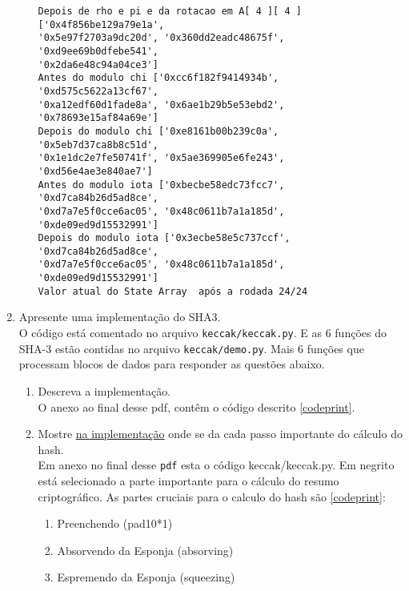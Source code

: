 \documentclass[12pt, a4paper]{article}
\begin{document}
\begin{enumerate}
\begin{enumerate}
\begin{verbatim}
Depois de rho e pi e da rotacao em A[ 4 ][ 4 ] ['0x4f856be129a79e1a',
'0x5e97f2703a9dc20d', '0x360dd2eadc48675f', '0xd9ee69b0dfebe541',
'0x2da6e48c94a04ce3']
Antes do modulo chi ['0xcc6f182f9414934b', '0xd575c5622a13cf67',
'0xa12edf60d1fade8a', '0x6ae1b29b5e53ebd2', '0x78693e15af84a69e']
Depois do modulo chi ['0xe8161b00b239c0a', '0x5eb7d37ca8b8c51d',
'0x1e1dc2e7fe50741f', '0x5ae369905e6fe243', '0xd56e4ae3e840ae7']
Antes do modulo iota ['0xbecbe58edc73fcc7', '0xd7ca84b26d5ad8ce',
'0xd7a7e5f0cce6ac05', '0x48c0611b7a1a185d', '0xde09ed9d15532991']
Depois do modulo iota ['0x3ecbe58e5c737ccf', '0xd7ca84b26d5ad8ce',
'0xd7a7e5f0cce6ac05', '0x48c0611b7a1a185d', '0xde09ed9d15532991']
Valor atual do State Array  após a rodada 24/24
\end{verbatim}

\end{enumerate}

\item Apresente uma implementação do SHA3.\\

O código está comentado no arquivo \verb|keccak/keccak.py|. E as 6 funções
do SHA-3 estão contidas no arquivo \verb|keccak/demo.py|. Mais 6 funções que
processam blocos de dados para responder as questões abaixo.

\begin{enumerate}

\item Descreva a implementação.\\

O anexo ao final desse pdf, contêm o código descrito \ref{codeprint}.\\

\item Mostre \underline{na implementação} onde se da cada passo importante do
cálculo do hash.\\

Em anexo no final desse \verb|pdf| esta o código keccak/keccak.py. Em negrito
está selecionado a parte importante para o cálculo do resumo criptográfico. As
partes cruciais para o calculo do hash são \ref{codeprint}:\\

  \begin{enumerate}
    \item Preenchendo (pad10*1)
    \item Absorvendo da Esponja (absorving)
    \item Espremendo da Esponja (squeezing)\\
  \end{enumerate}


\end{enumerate}
\end{enumerate}
\end{document}
